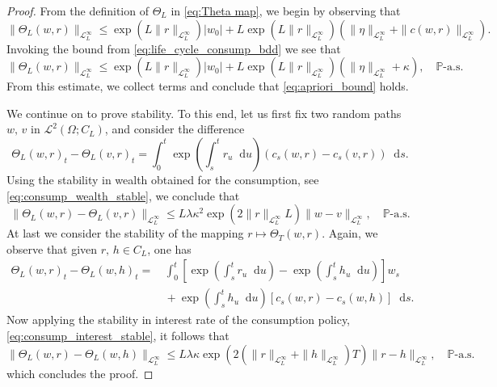 \documentclass[11pt,oneside,english,reqno,dvipsnames,table]{amsart}
\numberwithin{equation}{section}
\theoremstyle{plain}
\theoremstyle{definition}
\theoremstyle{remark}
\theoremstyle{plain}
\theoremstyle{plain}
\theoremstyle{plain}
\theoremstyle{plain}
\theoremstyle{plain}
\theoremstyle{plain}
\theoremstyle{plain}
\newcommand{\scL}{\mathscr{L}}
\newcommand{\dd}{\mathop{}\!\mathrm{d}}
\newcommand{\mbP}{\mathbb{P}}
\newcommand{\msL}{\mathscr{L}}
\numberwithin{thm}{section}
\begin{document}
  \begin{proof}
      From the definition of $\Theta_L$ in \eqref{eq:Theta map}, we begin by observing that 
      \begin{equation}\label{eq:sol_map_sup_bdd}
          \|\Theta_L(w,r)\|_{\msL^\infty_L} \leq \exp(L\|r\|_{\msL^\infty_L}) |w_0|+L\exp(L\|r\|_{\msL^\infty_L}) \left( \|\eta\|_{\msL^\infty_L} +\|c(w,r)\|_{\msL^\infty_L}\right) .  
      \end{equation}
     Invoking the bound from \eqref{eq:life_cycle_consump_bdd} we see that
      \[
      \|\Theta_L(w,r)\|_{\msL^\infty_L}  \leq \exp(L\|r\|_{\msL^\infty_L}) |w_0|+ L\exp(L\|r\|_{\msL^\infty_L}) \left(\|\eta\|_{\msL^\infty_L} + \kappa  \right),\quad \mbP\text{-a.s.}
      \]
      From this estimate, we collect terms and conclude that \eqref{eq:apriori_bound} holds.
      
      We continue on to prove 
      stability. To this end, let us first fix two random paths $w,\,v$ in $\scL^2(\Omega;C_L)$, and consider the difference 
      \begin{equation*}
         \Theta_L(w,r)_t- \Theta_L(v,r)_t = \int_0^t \exp\left(\int_s^t r_u \dd u\right)(c_s(w,r)-c_s(v,r))\dd s. 
      \end{equation*}
      Using the stability in wealth obtained for the consumption, see \eqref{eq:consump_wealth_stable}, we conclude that  
      \begin{equation*}
          \|\Theta_L(w,r)- \Theta_L(v,r)\|_{\msL^\infty_L} \leq L \lambda  \kappa^2 \exp(2\|r\|_{\msL^\infty_L} L) \|w-v\|_{\msL^\infty_L},\quad \mbP\text{-a.s.} 
      \end{equation*}
      At last we consider the stability of the mapping $r\mapsto \Theta_T(w,r)$. Again, we observe that given $r,\,h\in C_L$, one has
      \begin{align*}
                  \Theta_L(w,r)_t- \Theta_L(w,h)_t = &\,  \int_0^t \left[\exp\left(\int_s^t r_u \dd u\right)-\exp\left(\int_s^t h_u \dd u\right) \right]w_s
                  \\
                  &\, + \exp\left(\int_s^t h_u \dd u\right)\left[c_s(w,r)-c_s(w,h)\right]\dd s. 
      \end{align*}
      Now applying the stability in interest rate of the consumption policy, \eqref{eq:consump_interest_stable}, it follows that
      \[
      \|\Theta_L(w,r)- \Theta_L(w,h)\|_{\msL^\infty_L} \leq L \lambda  \kappa \exp(2(\|r\|_{\msL^\infty_L}+\|h\|_{\msL^\infty_L}) T) \|r-h\|_{\msL^\infty_L},\quad \mbP\text{-a.s.}
      \]
      which concludes the proof.
  \end{proof}
\end{document}
